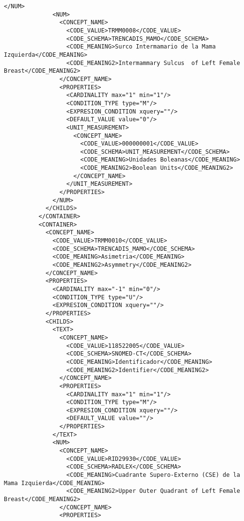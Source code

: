 \begin{lstlisting}[label=some-code,caption=Some Code]
              </NUM>
              <NUM>
                <CONCEPT_NAME>
                  <CODE_VALUE>TRMM0008</CODE_VALUE>
                  <CODE_SCHEMA>TRENCADIS_MAMO</CODE_SCHEMA>
                  <CODE_MEANING>Surco Intermamario de la Mama Izquierda</CODE_MEANING>
                  <CODE_MEANING2>Intermammary Sulcus  of Left Female Breast</CODE_MEANING2>
                </CONCEPT_NAME>
                <PROPERTIES>
                  <CARDINALITY max="1" min="1"/>
                  <CONDITION_TYPE type="M"/>
                  <EXPRESION_CONDITION xquery=""/>
                  <DEFAULT_VALUE value="0"/>
                  <UNIT_MEASUREMENT>
                    <CONCEPT_NAME>
                      <CODE_VALUE>000000001</CODE_VALUE>
                      <CODE_SCHEMA>UNIT_MEASUREMENT</CODE_SCHEMA>
                      <CODE_MEANING>Unidades Boleanas</CODE_MEANING>
                      <CODE_MEANING2>Boolean Units</CODE_MEANING2>
                    </CONCEPT_NAME>
                  </UNIT_MEASUREMENT>
                </PROPERTIES>
              </NUM>
            </CHILDS>
          </CONTAINER>
          <CONTAINER>
            <CONCEPT_NAME>
              <CODE_VALUE>TRMM0010</CODE_VALUE>
              <CODE_SCHEMA>TRENCADIS_MAMO</CODE_SCHEMA>
              <CODE_MEANING>Asimetria</CODE_MEANING>
              <CODE_MEANING2>Asymmetry</CODE_MEANING2>
            </CONCEPT_NAME>
            <PROPERTIES>
              <CARDINALITY max="-1" min="0"/>
              <CONDITION_TYPE type="U"/>
              <EXPRESION_CONDITION xquery=""/>
            </PROPERTIES>
            <CHILDS>
              <TEXT>
                <CONCEPT_NAME>
                  <CODE_VALUE>118522005</CODE_VALUE>
                  <CODE_SCHEMA>SNOMED-CT</CODE_SCHEMA>
                  <CODE_MEANING>Identificador</CODE_MEANING>
                  <CODE_MEANING2>Identifier</CODE_MEANING2>
                </CONCEPT_NAME>
                <PROPERTIES>
                  <CARDINALITY max="1" min="1"/>
                  <CONDITION_TYPE type="M"/>
                  <EXPRESION_CONDITION xquery=""/>
                  <DEFAULT_VALUE value=""/>
                </PROPERTIES>
              </TEXT>
              <NUM>
                <CONCEPT_NAME>
                  <CODE_VALUE>RID29930</CODE_VALUE>
                  <CODE_SCHEMA>RADLEX</CODE_SCHEMA>
                  <CODE_MEANING>Cuadrante Supero-Externo (CSE) de la Mama Izquierda</CODE_MEANING>
                  <CODE_MEANING2>Upper Outer Quadrant of Left Female Breast</CODE_MEANING2>
                </CONCEPT_NAME>
                <PROPERTIES>

\end{lstlisting}
